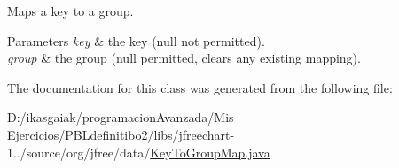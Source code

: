 Maps a key to a group.


\begin{DoxyParams}{Parameters}
{\em key} & the key ({\ttfamily null} not permitted). \\
\hline
{\em group} & the group ({\ttfamily null} permitted, clears any existing mapping). \\
\hline
\end{DoxyParams}


The documentation for this class was generated from the following file\+:\begin{DoxyCompactItemize}
\item 
D\+:/ikasgaiak/programacion\+Avanzada/\+Mis Ejercicios/\+P\+B\+Ldefinitibo2/libs/jfreechart-\/1../source/org/jfree/data/\mbox{\hyperlink{_key_to_group_map_8java}{Key\+To\+Group\+Map.\+java}}\end{DoxyCompactItemize}
